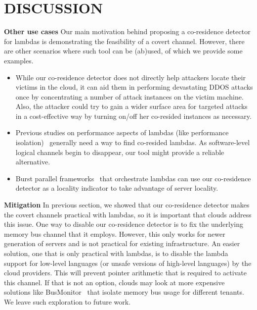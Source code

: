 \section{DISCUSSION}
\label{sec:discussion}
\textbf{Other use cases}
Our main motivation behind proposing a co-residence detector for lambdas is
demonstrating the feasibility of a covert channel. However, there are other
scenarios where such tool can be (ab)used, of which we provide some examples. 
\begin{itemize}
    \item While our co-residence detector does not directly help attackers
    locate their victims in the cloud, it can aid them in performing devastating 
    DDOS attacks once by concentrating a number of attack instances on the victim 
    machine. Also, the attacker could try to gain a wider surface area for 
    targeted attacks in a cost-effective way by turning on/off her co-resided 
    instances as necessary. 
    \item Previous studies on performance aspects of lambdas (like performance 
    isolation)~\cite{wangusenix2018} generally need a way to find co-resided
    lambdas. As software-level logical channels begin to disappear, our tool 
    might provide a reliable alternative.
    \item Burst parallel frameworks~\cite{234886} that orchestrate lambdas can
    use our co-residence detector as a locality indicator to take advantage of
    server locality.
\end{itemize}

\textbf{Mitigation}
In previous section, we showed that our co-residence detector makes the covert
channels practical with lambdas, so it is important that clouds address this
issue. One way to disable our co-residence detector is to fix the underlying
memory bus channel that it employs. However, this only works for newer
generation of servers and is not practical for existing infrastructure. An
easier solution, one that is only practical with lambdas, is to disable the
lambda support for low-level languages (or unsafe versions of high-level
languages) by the cloud providers. This will prevent pointer arithmetic that is
required to activate this channel. If that is not an option, clouds may look at
more expensive solutions like BusMonitor~\cite{MemoryBusMitigation} that isolate
memory bus usage for different tenants. We leave such exploration to future
work.
